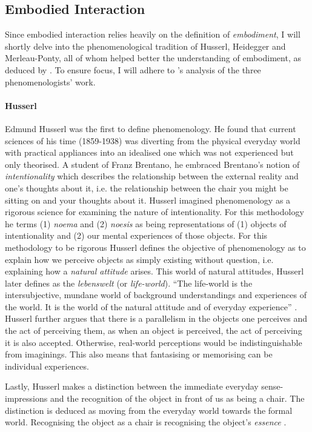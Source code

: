 \subsection{Embodied Interaction}
Since embodied interaction relies heavily on the definition of \textit{embodiment}, I will shortly delve into the phenomenological tradition of Husserl, Heidegger and Merleau-Ponty, all of whom helped better the understanding of embodiment, as deduced by . To ensure focus, I will adhere to \citeauthor{dourish}'s \citeyear{dourish} analysis of the three phenomenologists' work.

\paragraph{Husserl} Edmund Husserl was the first to define phenomenology. He found that current sciences of his time (1859-1938) was diverting from the physical everyday world with practical appliances into an idealised one which was not experienced but only theorised. A student of Franz Brentano, he embraced Brentano's notion of \textit{intentionality} which describes the relationship between the external reality and one's thoughts about it, i.e. the relationship between the chair you might be sitting on and your thoughts about it. Husserl imagined phenomenology as a rigorous science for examining the nature of intentionality. For this methodology he terms (1) \textit{noema} and (2) \textit{noesis} as being representations of (1) objects of intentionality and (2) our mental experiences of those objects. For this methodology to be rigorous Husserl defines the objective of phenomenology as to explain how we perceive objects as simply existing without question, i.e. explaining how a \textit{natural attitude} arises. This world of natural attitudes, Husserl later defines as the \textit{lebenswelt} (or \textit{life-world}). ``The life-world is the intersubjective, mundane world of background understandings and experiences of the world. It is the world of the natural attitude and of everyday experience'' \cite[p. 106]{dourish}. Husserl further argues that there is a parallelism in the objects one perceives and the act of perceiving them, as when an object is perceived, the act of perceiving it is also accepted. Otherwise, real-world perceptions would be indistinguishable from imaginings. This also means that fantasising or memorising can be individual experiences.

Lastly, Husserl makes a distinction between the immediate everyday sense-impressions and the recognition of the object in front of us as being a chair. The distinction is deduced as moving from the everyday world towards the formal world. Recognising the object as a chair is recognising the object's \textit{essence} \cite{dourish}.

